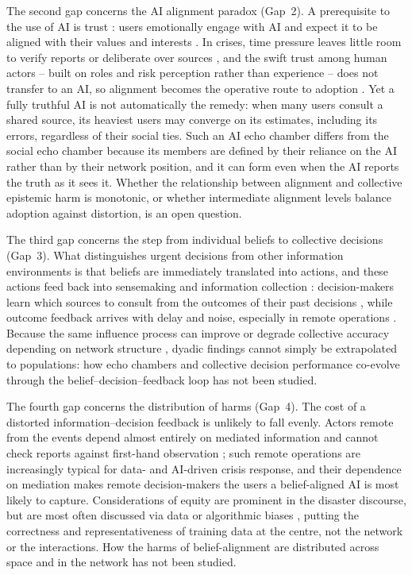 \documentclass[pdflatex,sn-nature]{sn-jnl}
\begin{document}
The second gap concerns the AI alignment paradox (Gap~2). A prerequisite to the use of AI is trust \citep{afroogh2024trust,glikson2020human}: users emotionally engage with AI \citep{weizenbaum1966eliza,kaplan2023trust} and expect it to be aligned with their values and interests \citep{manzini2024should}. In crises, time pressure leaves little room to verify reports or deliberate over sources \citep{tzachor2020artificial,visave2025transparency}, and the swift trust among human actors -- built on roles and risk perception rather than experience \citep{tatham2010application} -- does not transfer to an AI, so alignment becomes the operative route to adoption \citep{glikson2020human,lee2004trust}. Yet a fully truthful AI is not automatically the remedy: when many users consult a shared source, its heaviest users may converge on its estimates, including its errors, regardless of their social ties. Such an AI echo chamber differs from the social echo chamber because its members are defined by their reliance on the AI rather than by their network position, and it can form even when the AI reports the truth as it sees it. Whether the relationship between alignment and collective epistemic harm is monotonic, or whether intermediate alignment levels balance adoption against distortion, is an open question.

The third gap concerns the step from individual beliefs to collective decisions (Gap~3). What distinguishes urgent decisions from other information environments is that beliefs are immediately translated into actions, and these actions feed back into sensemaking and information collection \citep{gralla2016problem}: decision-makers learn which sources to consult from the outcomes of their past decisions \citep{march1991exploration}, while outcome feedback arrives with delay and noise, especially in remote operations \citep{comes2020coordination}. Because the same influence process can improve or degrade collective accuracy depending on network structure \citep{lorenz2011social,becker2017network}, dyadic findings cannot simply be extrapolated to populations: how echo chambers and collective decision performance co-evolve through the belief--decision--feedback loop has not been studied.

The fourth gap concerns the distribution of harms (Gap~4). The cost of a distorted information--decision feedback is unlikely to fall evenly. Actors remote from the events depend almost entirely on mediated information and cannot check reports against first-hand observation \citep{holguin2012unique,comes2020coordination}; such remote operations are increasingly typical for data- and AI-driven crisis response, and their dependence on mediation makes remote decision-makers the users a belief-aligned AI is most likely to capture. Considerations of equity are prominent in the disaster discourse, but are most often discussed via data or algorithmic biases \citep{coleman2024weaving,beduschi2022harnessing}, putting the correctness and representativeness of training data at the centre, not the network or the interactions. How the harms of belief-alignment are distributed across space and in the network has not been studied.
\end{document}
